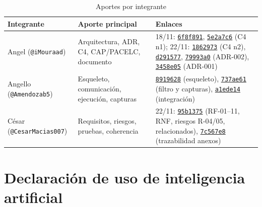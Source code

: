 \begin{table}[H]
\centering
\caption{Aportes por integrante}
\label{tab:aportes}
\small
\begin{tabularx}{\linewidth}{@{}lYl@{}}
\toprule
Integrante & Aporte principal & Enlaces \\
\midrule
Angel (\texttt{@iMouraad}) & Arquitectura, ADR, C4, CAP/PACELC, documento & 18/11: \href{https://github.com/Amendozab5/sgiri-distribuido/commit/6f8f891}{\texttt{6f8f891}}, \href{https://github.com/Amendozab5/sgiri-distribuido/commit/5e2a7c6}{\texttt{5e2a7c6}} (C4 n1); 22/11: \href{https://github.com/Amendozab5/sgiri-distribuido/commit/1862973}{\texttt{1862973}} (C4 n2), \href{https://github.com/Amendozab5/sgiri-distribuido/commit/d291577}{\texttt{d291577}}, \href{https://github.com/Amendozab5/sgiri-distribuido/commit/79993a0}{\texttt{79993a0}} (ADR-002), \href{https://github.com/Amendozab5/sgiri-distribuido/commit/3458e05}{\texttt{3458e05}} (ADR-001) \\
Angello (\texttt{@Amendozab5}) & Esqueleto, comunicación, ejecución, capturas & \href{https://github.com/Amendozab5/sgiri-distribuido/commit/8919628}{\texttt{8919628}} (esqueleto), \href{https://github.com/Amendozab5/sgiri-distribuido/commit/737ae61}{\texttt{737ae61}} (filtro y capturas), \href{https://github.com/Amendozab5/sgiri-distribuido/commit/a1ede14}{\texttt{a1ede14}} (integración) \\
César (\texttt{@CesarMacias007}) & Requisitos, riesgos, pruebas, coherencia & 22/11: \href{https://github.com/Amendozab5/sgiri-distribuido/commit/95b1375}{\texttt{95b1375}} (RF-01--11, RNF, riesgos R-04/05, relacionados), \href{https://github.com/Amendozab5/sgiri-distribuido/commit/7c567e8}{\texttt{7c567e8}} (trazabilidad anexos) \\
\bottomrule
\end{tabularx}
\end{table}

\section{Declaración de uso de inteligencia artificial}

